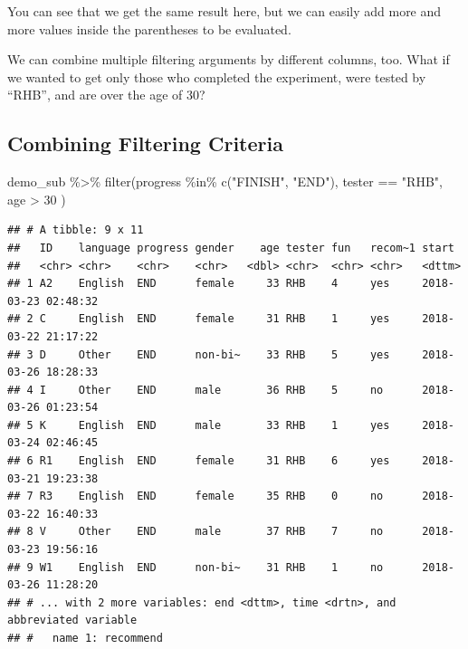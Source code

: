 \documentclass[
]{book}
\newenvironment{Shaded}{\begin{snugshade}}{\end{snugshade}}
\newcommand{\DecValTok}[1]{\textcolor[rgb]{0.00,0.00,0.81}{#1}}
\newcommand{\FunctionTok}[1]{\textcolor[rgb]{0.00,0.00,0.00}{#1}}
\newcommand{\NormalTok}[1]{#1}
\newcommand{\SpecialCharTok}[1]{\textcolor[rgb]{0.00,0.00,0.00}{#1}}
\newcommand{\StringTok}[1]{\textcolor[rgb]{0.31,0.60,0.02}{#1}}
\begin{document}
You can see that we get the same result here, but we can easily add more and more values inside the parentheses to be evaluated.

We can combine multiple filtering arguments by different columns, too. What if we wanted to get only those who completed the experiment, were tested by ``RHB'', and are over the age of 30?

\hypertarget{combining-filtering-criteria}{%
\subsection{Combining Filtering Criteria}\label{combining-filtering-criteria}}

\begin{Shaded}
\begin{Highlighting}[]
\NormalTok{demo\_sub }\SpecialCharTok{\%\textgreater{}\%} \FunctionTok{filter}\NormalTok{(progress }\SpecialCharTok{\%in\%} \FunctionTok{c}\NormalTok{(}\StringTok{"FINISH"}\NormalTok{, }\StringTok{"END"}\NormalTok{),}
\NormalTok{                    tester }\SpecialCharTok{==} \StringTok{"RHB"}\NormalTok{,}
\NormalTok{                    age }\SpecialCharTok{\textgreater{}} \DecValTok{30}
\NormalTok{                    )}
\end{Highlighting}
\end{Shaded}

\begin{verbatim}
## # A tibble: 9 x 11
##   ID    language progress gender    age tester fun   recom~1 start              
##   <chr> <chr>    <chr>    <chr>   <dbl> <chr>  <chr> <chr>   <dttm>             
## 1 A2    English  END      female     33 RHB    4     yes     2018-03-23 02:48:32
## 2 C     English  END      female     31 RHB    1     yes     2018-03-22 21:17:22
## 3 D     Other    END      non-bi~    33 RHB    5     yes     2018-03-26 18:28:33
## 4 I     Other    END      male       36 RHB    5     no      2018-03-26 01:23:54
## 5 K     English  END      male       33 RHB    1     yes     2018-03-24 02:46:45
## 6 R1    English  END      female     31 RHB    6     yes     2018-03-21 19:23:38
## 7 R3    English  END      female     35 RHB    0     no      2018-03-22 16:40:33
## 8 V     Other    END      male       37 RHB    7     no      2018-03-23 19:56:16
## 9 W1    English  END      non-bi~    31 RHB    1     no      2018-03-26 11:28:20
## # ... with 2 more variables: end <dttm>, time <drtn>, and abbreviated variable
## #   name 1: recommend
\end{verbatim}
\end{document}
